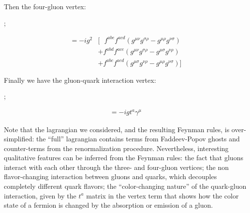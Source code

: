 Then the four-gluon vertex:
\begin{center}
    \begin{minipage}{0.4\textwidth}
        \hspace{2cm};
    \end{minipage}
    \begin{minipage}{0.58\textwidth}
        \begin{align}\nonumber = -ig^2&
        [~~~f^{abe}f^{acd}(g^{\mu\nu}g^{\sigma\rho} - g^{\mu\rho}g^{\nu\sigma}) \\\nonumber
        &+f^{abd}f^{ace}(g^{\mu\nu}g^{\sigma\rho} - g^{\mu\sigma}g^{\nu\rho}) \\\nonumber 
        &+f^{abc}f^{aed}(g^{\mu\sigma}g^{\nu\rho} - g^{\mu\rho}g^{\nu\sigma})]
        \end{align}
    \end{minipage}
\end{center}
Finally we have the gluon-quark interaction vertex:
\begin{center}
    \begin{minipage}{0.4\textwidth}
        \hspace{2cm};
    \end{minipage}
    \begin{minipage}{0.58\textwidth}
        \hspace{-1.5cm}\begin{align}\nonumber = -igt^a\gamma^\mu
        \end{align}
    \end{minipage}
\end{center}
Note that the lagrangian we considered, and the resulting Feynman rules, is over-simplified: the ``full'' lagrangian contains terms from Faddeev-Popov ghosts and counter-terms from the renormalization procedure. Nevertheless, interesting qualitative features can be inferred from the Feynman rules: the fact that gluons interact with each other through the three- and four-gluon vertices; the non flavor-changing interaction between gluons and quarks, which decouples completely different quark flavors; the ``color-changing nature'' of the quark-gluon interaction, given by the $t^a$ matrix in the vertex term that shows how the color state of a fermion is changed by the absorption or emission of a gluon.\\


